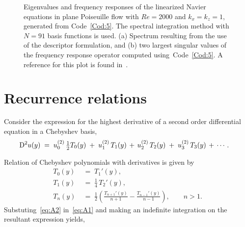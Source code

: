 \documentclass[%
secnumarabic,%
 amssymb, amsmath,%
 aps,prf,superscriptaddress,longbibliography
frontmatterverbose,
]{revtex4-2}
\begin{document}

\begin{figure}
  \centering
	\caption{\label{fig:2}   Eigenvalues and frequency responses of the linearized Navier  equations in plane Poiseuille flow with $Re = 2000$ and $k_x = k_z = 1$, generated from Code~\ref{Cod:5}. The spectral integration method with $N = 91$ basis functions is used. (a) Spectrum resulting from the use of the descriptor formulation, and (b) two largest singular values of the frequency response operator computed using~Code~\ref{Cod:5}. A reference for this plot is found in~\cite[Figure 4.10]{schmid2012stability}.}
  \end{figure}

  \newpage\noindent

  \appendix
\section{Recurrence relations}\label{app:ind-int}
Consider the expression for the highest derivative of a second order differential equation in a Chebyshev basis,
\begin{align}\label{eq:A1}
  \mathrm D^2 u (y) \;&=\; u_0^{(2)} \,\tfrac{1}{2}T_0(y) \;+\; u_1^{(2)}\,T_1(y) \,+\, u_2^{(2)}\,T_2(y) \;+\; u_3^{(2)}\,T_3(y) \,+\, \cdots.
\end{align}

Relation of Chebyshev polynomials with derivatives is given by~\cite[Equation 3.25]{chebExpanExact}
\begin{subequations}\label{eq:A2}
\begin{align}
  T_0(y) \;&=\; T_1'(y),\\
  T_1(y) \;&=\; \tfrac{1}{4}\,T_2'(y),\\
  T_n(y) \;&=\; \tfrac{1}{2}\left( \frac{T_{n+1}'(y)}{n+1} - \frac{T_{n-1}'(y)}{n-1}\right), \qquad n > 1.
\end{align}
\end{subequations}
Substuting~\eqref{eq:A2} in~\eqref{eq:A1} and making an indefinite integration on the resultant expression yields,
\end{document}
